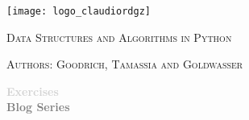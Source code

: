 \newcommand{\HRule}{\rule{\linewidth}{0.2mm}}
\begin{titlepage}
\begin{center}

\begin{LOGOWEBPAGE}
\texttt{[image: logo\_claudiordgz]}
\end{LOGOWEBPAGE}
\begin{navbartext}
	\huge \textsc{Data Structures and Algorithms in Python}\\[0.1cm]
\end{navbartext}
\begin{navbartext}
	\huge \textsc{Authors: Goodrich, Tamassia and Goldwasser}
\end{navbartext}


\vfill
\begin{navbartext}
	\fontsize{80}{90} \bfseries \textcolor{lightgray}{Exercises}\\[0.5cm]
	\Large \textcolor{gray}{Blog Series}
\end{navbartext}
\end{center}
\end{titlepage}